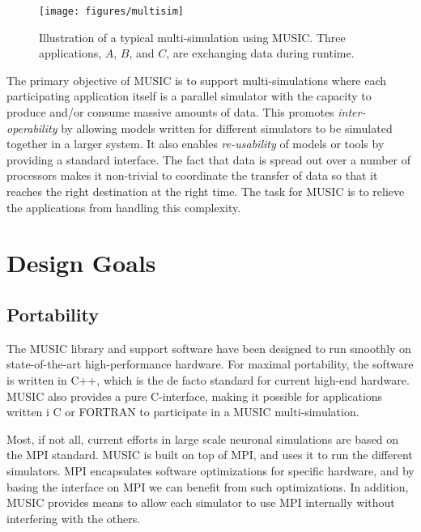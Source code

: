 \documentclass[a4paper]{report}
\begin{document}
\begin{figure}
  \begin{center}
    \texttt{[image: figures/multisim]}
    \caption[Typical multi-simulation]{\label{fig:multisim}
      Illustration of a typical multi-simulation using MUSIC.  Three
      applications, $A$, $B$, and $C$, are exchanging data during
      runtime.
    }
  \end{center}
\end{figure}

The primary objective of MUSIC is to support multi-simulations where
each participating application itself is a parallel simulator with the
capacity to produce and/or consume massive amounts of data.  This
promotes \emph{inter-operability} by allowing models written for
different simulators to be simulated together in a larger system.  It
also enables \emph{re-usability} of models or tools by providing a
standard interface.  The fact that data is spread out over a number of
processors makes it non-trivial to coordinate the transfer of data so
that it reaches the right destination at the right time.  The task for
MUSIC is to relieve the applications from handling this complexity.


\section{Design Goals}

\subsection{Portability}

The MUSIC library and support software have been designed to run
smoothly on state-of-the-art high-performance hardware.  For maximal
portability, the software is written in C++, which is the
de facto standard for current high-end hardware.  MUSIC also provides a
pure C-interface, making it possible for applications written i C or
FORTRAN to participate in a MUSIC multi-simulation.

Most, if not all, current efforts in large scale neuronal simulations
are based on the MPI standard.  MUSIC is built on top of
MPI, and uses it to run the different simulators.  MPI encapsulates
software optimizations for specific hardware, and by basing the
interface on MPI we can benefit from such optimizations.  In
addition, MUSIC provides means to allow each simulator to use MPI
internally without interfering with the others.
\end{document}
